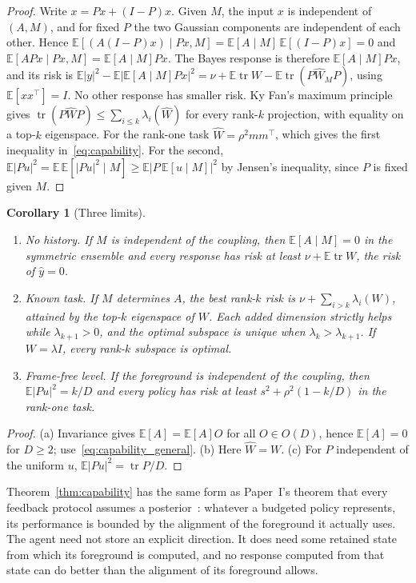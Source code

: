 \documentclass[12pt]{article}
\newtheorem{corollary}[theorem]{Corollary}
\theoremstyle{definition}
\newcommand{\E}{\mathbb E}
\newcommand{\tr}{\operatorname{tr}}
\begin{document}
\begin{proof}
Write $x=Px+(I-P)x$. Given $M$, the input $x$ is independent of $(A,M)$, and for fixed $P$ the two Gaussian components are independent of each other. Hence $\E[(A(I-P)x)\mid Px,M]=\E[A\mid M]\,\E[(I-P)x]=0$ and $\E[APx\mid Px,M]=\E[A\mid M]Px$. The Bayes response is therefore $\E[A\mid M]Px$, and its risk is $\E|y|^2-\E|\E[A\mid M]Px|^2=\nu+\E\tr W-\E\tr(P\widehat W_MP)$, using $\E[x x^{\top}]=I$. No other response has smaller risk. Ky Fan's maximum principle gives $\tr(P\widehat W P)\le\sum_{i\le k}\lambda_i(\widehat W)$ for every rank-$k$ projection, with equality on a top-$k$ eigenspace. For the rank-one task $\widehat W=\rho^2mm^{\top}$, which gives the first inequality in~\eqref{eq:capability}. For the second, $\E|Pu|^2=\E\,\E[|Pu|^2\mid M]\ge\E|P\,\E[u\mid M]|^2$ by Jensen's inequality, since $P$ is fixed given $M$.
\end{proof}

\begin{corollary}[Three limits]
\label{cor:limits}
\begin{enumerate}
\item[(a)] \emph{No history.} If $M$ is independent of the coupling, then $\E[A\mid M]=0$ in the symmetric ensemble and every response has risk at least $\nu+\E\tr W$, the risk of $\hat y=0$.
\item[(b)] \emph{Known task.} If $M$ determines $A$, the best rank-$k$ risk is $\nu+\sum_{i>k}\lambda_i(W)$, attained by the top-$k$ eigenspace of $W$. Each added dimension strictly helps while $\lambda_{k+1}>0$, and the optimal subspace is unique when $\lambda_k>\lambda_{k+1}$. If $W=\lambda I$, every rank-$k$ subspace is optimal.
\item[(c)] \emph{Frame-free level.} If the foreground is independent of the coupling, then $\E|Pu|^2=k/D$ and every policy has risk at least $s^2+\rho^2(1-k/D)$ in the rank-one task.
\end{enumerate}
\end{corollary}

\begin{proof}
(a) Invariance gives $\E[A]=\E[A]O$ for all $O\in O(D)$, hence $\E[A]=0$ for $D\ge2$; use~\eqref{eq:capability_general}. (b) Here $\widehat W=W$. (c) For $P$ independent of the uniform $u$, $\E|Pu|^2=\tr P/D$.
\end{proof}

Theorem~\ref{thm:capability} has the same form as Paper~I's theorem that every feedback protocol assumes a posterior~\cite{Liu2026TDOME_I}: whatever a budgeted policy represents, its performance is bounded by the alignment of the foreground it actually uses. The agent need not store an explicit direction. It does need some retained state from which its foreground is computed, and no response computed from that state can do better than the alignment of its foreground allows.
\end{document}
